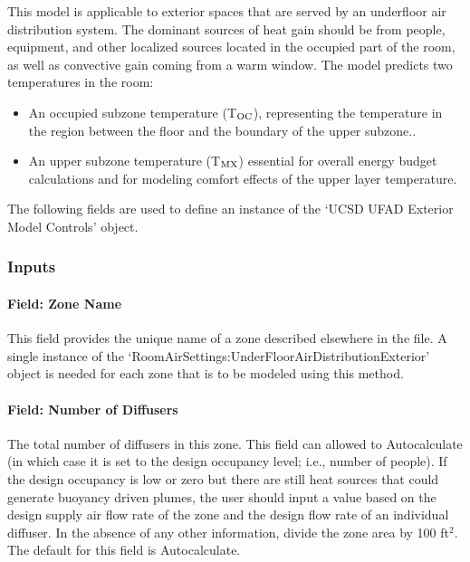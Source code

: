 This model is applicable to exterior spaces that are served by an underfloor air distribution system. The dominant sources of heat gain should be from people, equipment, and other localized sources located in the occupied part of the room, as well as convective gain coming from a warm window. The model predicts two temperatures in the room:

\begin{itemize}
\item
  An occupied subzone temperature (T\(_{\rm{OC}}\)), representing the temperature in the region between the floor and the boundary of the upper subzone..
\item
  An upper subzone temperature (T\(_{\rm{MX}}\)) essential for overall energy budget calculations and for modeling comfort effects of the upper layer temperature.
\end{itemize}

The following fields are used to define an instance of the `UCSD UFAD Exterior Model Controls' object.

\subsubsection{Inputs}\label{inputs-11-016}

\paragraph{Field: Zone Name}\label{field-zone-name-7-003}

This field provides the unique name of a zone described elsewhere in the file. A single instance of the `RoomAirSettings:UnderFloorAirDistributionExterior' object is needed for each zone that is to be modeled using this method.

\paragraph{Field: Number of Diffusers}\label{field-number-of-diffusers-1}

The total number of diffusers in this zone. This field can allowed to Autocalculate (in which case it is set to the design occupancy level; i.e., number of people). If the design occupancy is low or zero but there are still heat sources that could generate buoyancy driven plumes, the user should input a value based on the design supply air flow rate of the zone and the design flow rate of an individual diffuser. In the absence of any other information, divide the zone area by 100 ft\(^{2}\). The default for this field is Autocalculate.

